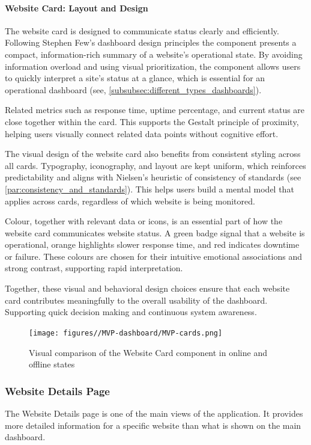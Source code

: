 \paragraph{Website Card: Layout and Design}
\label{par:website_card_design}

The website card is designed to communicate status clearly and efficiently. Following Stephen Few's dashboard design principles the component presents a compact, information-rich summary of a website's operational state. By avoiding information overload and using visual prioritization, the component allows users to quickly interpret a site's status at a glance, which is essential for an operational dashboard (see, \ref{subsubsec:different_types_dashboards}). 

Related metrics such as response time, uptime percentage, and current status are close together within the card. This supports the Gestalt principle of proximity, helping users visually connect related data points without cognitive effort. 

The visual design of the website card also benefits from consistent styling across all cards. Typography, iconography, and layout are kept uniform, which reinforces predictability and aligns with Nielsen's heuristic of consistency of standards (see \ref{par:consistency_and_standards}). This helps users build a mental model that applies across cards, regardless of which website is being monitored. 

Colour, together with relevant data or icons, is an essential part of how the website card communicates website status. A green badge signal that a website is operational, orange highlights slower response time, and red indicates downtime or failure. These colours are chosen for their intuitive emotional associations and strong contrast, supporting rapid interpretation. 

Together, these visual and behavioral design choices ensure that each website card contributes meaningfully to the overall usability of the dashboard. Supporting quick decision making and continuous system awareness.


\begin{figure}[H]
    \centering
    \texttt{[image: figures//MVP-dashboard/MVP-cards.png]}
    \caption{Visual comparison of the Website Card component in online and offline states}
    \label{fig:websitecard-comparison}
\end{figure}



\subsubsection{Website Details Page}
The Website Details page is one of the main views of the application. It provides more detailed information for a specific website than what is shown on the main dashboard.

